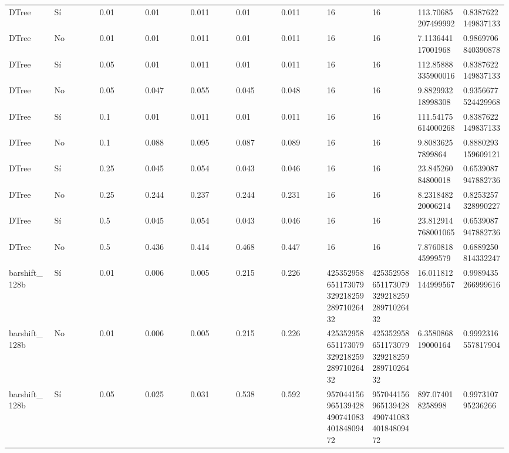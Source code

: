 {{\begin{longtable}{M{0.09\linewidth}M{0.09\linewidth}M{0.09\linewidth}M{0.09\linewidth}M{0.09\linewidth}M{0.09\linewidth}M{0.09\linewidth}M{0.09\linewidth}M{0.09\linewidth}M{0.09\linewidth}M{0.09\linewidth}}
DTree & Sí & \num{0.01} & \num{0.01} & \num{0.011} & \num{0.01} & \num{0.011} & \num{16} & \num{16} & \num{113.70685207499992} & \num{0.8387622149837133} \\
DTree & No & \num{0.01} & \num{0.01} & \num{0.011} & \num{0.01} & \num{0.011} & \num{16} & \num{16} & \num{7.113644117001968} & \num{0.9869706840390878} \\
DTree & Sí & \num{0.05} & \num{0.01} & \num{0.011} & \num{0.01} & \num{0.011} & \num{16} & \num{16} & \num{112.85888335900016} & \num{0.8387622149837133} \\
DTree & No & \num{0.05} & \num{0.047} & \num{0.055} & \num{0.045} & \num{0.048} & \num{16} & \num{16} & \num{9.882993218998308} & \num{0.9356677524429968} \\
DTree & Sí & \num{0.1} & \num{0.01} & \num{0.011} & \num{0.01} & \num{0.011} & \num{16} & \num{16} & \num{111.54175614000268} & \num{0.8387622149837133} \\
DTree & No & \num{0.1} & \num{0.088} & \num{0.095} & \num{0.087} & \num{0.089} & \num{16} & \num{16} & \num{9.80836257899864} & \num{0.8880293159609121} \\
DTree & Sí & \num{0.25} & \num{0.045} & \num{0.054} & \num{0.043} & \num{0.046} & \num{16} & \num{16} & \num{23.84526084800018} & \num{0.6539087947882736} \\
DTree & No & \num{0.25} & \num{0.244} & \num{0.237} & \num{0.244} & \num{0.231} & \num{16} & \num{16} & \num{8.231848220006214} & \num{0.8253257328990227} \\
DTree & Sí & \num{0.5} & \num{0.045} & \num{0.054} & \num{0.043} & \num{0.046} & \num{16} & \num{16} & \num{23.812914768001065} & \num{0.6539087947882736} \\
DTree & No & \num{0.5} & \num{0.436} & \num{0.414} & \num{0.468} & \num{0.447} & \num{16} & \num{16} & \num{7.876081845999579} & \num{0.6889250814332247} \\
barshift\_128b & Sí & \num{0.01} & \num{0.006} & \num{0.005} & \num{0.215} & \num{0.226} & \num{42535295865117307932921825928971026432} & \num{42535295865117307932921825928971026432} & \num{16.011812144999567} & \num{0.9989435266999616} \\
barshift\_128b & No & \num{0.01} & \num{0.006} & \num{0.005} & \num{0.215} & \num{0.226} & \num{42535295865117307932921825928971026432} & \num{42535295865117307932921825928971026432} & \num{6.358086819000164} & \num{0.9992316557817904} \\
barshift\_128b & Sí & \num{0.05} & \num{0.025} & \num{0.031} & \num{0.538} & \num{0.592} & \num{95704415696513942849074108340184809472} & \num{95704415696513942849074108340184809472} & \num{897.074018258998} & \num{0.997310795236266} \\

\end{longtable}}}
